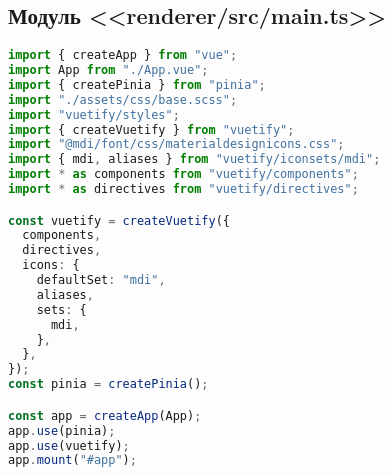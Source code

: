 \subsection{Модуль <<renderer/src/main.ts>>}
\begin{lstlisting}[language=typescript]
import { createApp } from "vue";
import App from "./App.vue";
import { createPinia } from "pinia";
import "./assets/css/base.scss";
import "vuetify/styles";
import { createVuetify } from "vuetify";
import "@mdi/font/css/materialdesignicons.css";
import { mdi, aliases } from "vuetify/iconsets/mdi";
import * as components from "vuetify/components";
import * as directives from "vuetify/directives";

const vuetify = createVuetify({
  components,
  directives,
  icons: {
    defaultSet: "mdi",
    aliases,
    sets: {
      mdi,
    },
  },
});
const pinia = createPinia();

const app = createApp(App);
app.use(pinia);
app.use(vuetify);
app.mount("#app");  
\end{lstlisting}
